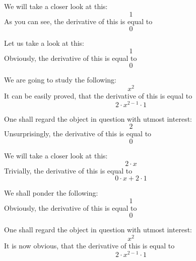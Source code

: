 \documentclass{article}
\begin{document}
We will take a closer look at this:
\begin{equation}
1 
\end{equation}
As you can see, the derivative of this is equal to
\begin{equation}
0 
\end{equation}

Let us take a look at this:
\begin{equation}
1 
\end{equation}
Obviously, the derivative of this is equal to
\begin{equation}
0 
\end{equation}

We are going to study the following:
\begin{equation}
x ^{2 } 
\end{equation}
It can be easily proved, that the derivative of this is equal to
\begin{equation}
2 \cdot x ^{2 - 1 } \cdot 1 
\end{equation}

One shall regard the object in question with utmost interest:
\begin{equation}
2 
\end{equation}
Unsurprisingly, the derivative of this is equal to
\begin{equation}
0 
\end{equation}

We will take a closer look at this:
\begin{equation}
2 \cdot x 
\end{equation}
Trivially, the derivative of this is equal to
\begin{equation}
0 \cdot x + 2 \cdot 1 
\end{equation}

We shall ponder the following:
\begin{equation}
1 
\end{equation}
Obviously, the derivative of this is equal to
\begin{equation}
0 
\end{equation}

One shall regard the object in question with utmost interest:
\begin{equation}
x ^{2 } 
\end{equation}
It is now obvious, that the derivative of this is equal to
\begin{equation}
2 \cdot x ^{2 - 1 } \cdot 1 
\end{equation}
\end{document}
